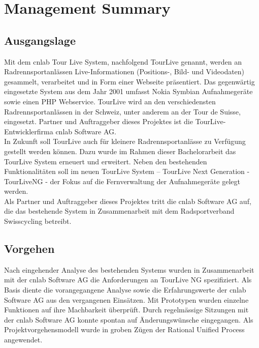 \chapter*{Management Summary}
\section*{Ausgangslage}

Mit dem cnlab Tour Live System, nachfolgend TourLive genannt, werden an Radrennsportanlässen Live-Informationen (Positions-, Bild- und Videodaten) gesammelt, verarbeitet und in Form einer Webseite präsentiert. Das gegenwärtig eingesetzte System aus dem Jahr 2001  umfasst Nokia Symbian Aufnahmegeräte sowie einen PHP Webservice. TourLive wird an den verschiedensten Radrennsportanlässen in der Schweiz, unter anderem an der Tour de Suisse, eingesetzt. Partner und Auftraggeber dieses Projektes ist die TourLive-Entwicklerfirma cnlab Software AG. 
\\

In Zukunft soll TourLive auch für kleinere Radrennsportanlässe zu Verfügung gestellt werden können. Dazu wurde im Rahmen dieser Bachelorarbeit das TourLive System erneuert und erweitert. Neben den bestehenden Funktionalitäten soll im neuen  TourLive System – TourLive Next Generation - TourLiveNG - der Fokus auf die Fernverwaltung der Aufnahmegeräte gelegt werden. 
\\

Als Partner und Auftraggeber dieses Projektes tritt die cnlab Software AG auf, die das bestehende System in Zusammenarbeit mit dem Radsportverband Swisscycling betreibt.


\section*{Vorgehen}
Nach eingehender Analyse des bestehenden Systems wurden in Zusammenarbeit mit der cnlab Software AG die Anforderungen an TourLive NG spezifiziert. Als Basis diente die vorangegangene Analyse sowie die  Erfahrungswerte der cnlab Software AG aus den vergangenen Einsätzen. Mit Prototypen wurden einzelne Funktionen auf ihre Machbarkeit überprüft. Durch regelmässige Sitzungen mit der cnlab Software AG konnte spontan auf Änderungswünsche eingegangen. Als Projektvorgehensmodell wurde in groben Zügen der Rational Unified Process angewendet. 
\\

